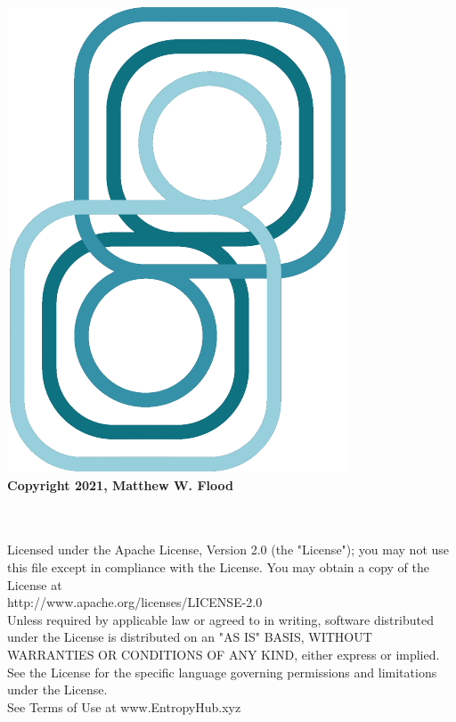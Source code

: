 \thispagestyle{plain}
	
\footnotesize

	\begingroup
	  \begin{center}	 
	  \vspace*{4cm} 
		\includegraphics[scale=.75]{EntropyHubLogo3.png}	\\	
		\vspace*{\fill}
	  \textbf{Copyright 2021, Matthew W. Flood}\\ \ \\ \
		\end{center}	   
	
	  \noindent Licensed under the Apache License, Version 2.0 (the "License");
	   you may not use this file except in compliance with the License.
	   You may obtain a copy of the License at \\	   
	
	       http://www.apache.org/licenses/LICENSE-2.0\\
	
	   \noindent Unless required by applicable law or agreed to in writing, software
	   distributed under the License is distributed on an "AS IS" BASIS,
	   WITHOUT WARRANTIES OR CONDITIONS OF ANY KIND, either express or implied.
	   See the License for the specific language governing permissions and
	   limitations under the License.\\
	   
	   \noindent See Terms of Use at www.EntropyHub.xyz\\ %
		
	\endgroup

\normalsize
	
